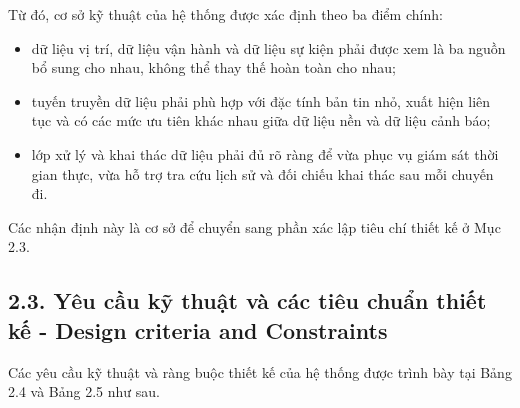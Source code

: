 \documentclass[a4paper]{extarticle}
\providecommand{\tightlist}{%
  \setlength{\itemsep}{0pt}\setlength{\parskip}{0pt}}
\begin{document}
Từ đó, cơ sở kỹ thuật của hệ thống được xác định theo ba điểm chính:

\begin{itemize}
\tightlist
\item
  dữ liệu vị trí, dữ liệu vận hành và dữ liệu sự kiện phải được xem là ba nguồn bổ sung cho nhau, không thể thay thế hoàn toàn cho nhau;
\item
  tuyến truyền dữ liệu phải phù hợp với đặc tính bản tin nhỏ, xuất hiện liên tục và có các mức ưu tiên khác nhau giữa dữ liệu nền và dữ liệu cảnh báo;
\item
  lớp xử lý và khai thác dữ liệu phải đủ rõ ràng để vừa phục vụ giám sát thời gian thực, vừa hỗ trợ tra cứu lịch sử và đối chiếu khai thác sau mỗi chuyến đi.
\end{itemize}

Các nhận định này là cơ sở để chuyển sang phần xác lập tiêu chí thiết kế ở Mục 2.3.

\subsection{2.3. Yêu cầu kỹ thuật và các tiêu chuẩn thiết kế - Design criteria and Constraints}\label{yuxeau-cux1ea7u-kux1ef9-thuux1eadt-vuxe0-cuxe1c-tiuxeau-chuux1ea9n-thiux1ebft-kux1ebf---design-criteria-and-constraints}

Các yêu cầu kỹ thuật và ràng buộc thiết kế của hệ thống được trình bày tại Bảng 2.4 và Bảng 2.5 như sau.
\end{document}
